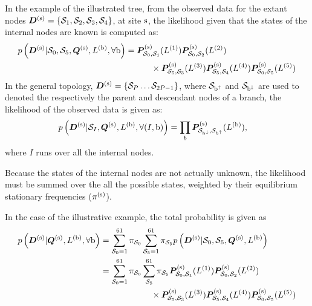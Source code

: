 In the example of the illustrated tree, from the observed data for the extant nodes $\bm{D}^{(\text{s})} = \{ \mathcal{S}_1,\mathcal{S}_2, \mathcal{S}_3, \mathcal{S}_4 \}$, at site $\text{s}$, the likelihood given that the states of the internal nodes are known is computed as:
\begin{align}
	p\left(\bm{D}^{(\text{s})}| \mathcal{S}_0, \mathcal{S}_5, \bm{Q}^{(\text{s})}, L^{(\text{b})}, \forall \text{b} \right) & = \bm{P}^{(\text{s})}_{\mathcal{S}_0, \mathcal{S}_1}(L^{(1)})
	\bm{P}^{(\text{s})}_{\mathcal{S}_0, \mathcal{S}_2}(L^{(2)}) \\
	& \quad \quad \quad
	\times \bm{P}^{(\text{s})}_{\mathcal{S}_5, \mathcal{S}_3}(L^{(3)})
	\bm{P}^{(\text{s})}_{\mathcal{S}_5, \mathcal{S}_4}(L^{(4)})
	\bm{P}^{(\text{s})}_{\mathcal{S}_0, \mathcal{S}_5}(L^{(5)}) \notag
\end{align}
In the general topology, $\bm{D}^{(\text{s})} = \{ \mathcal{S}_P \hdots \mathcal{S}_{2P-1} \}$, where $\mathcal{S}_{\text{b}^{\uparrow}}$ and $\mathcal{S}_{\text{b}^{\downarrow}}$ are used to denoted the respectively the parent and descendant nodes of a branch, the likelihood of the observed data is given as:
\begin{align}
p\left(\bm{D}^{(\text{s})}| \mathcal{S}_{I}, \bm{Q}^{(\text{s})}, L^{(\text{b})}, \forall (I, \text{b}) \right) & = \prod_{b} \bm{P}^{(\text{s})}_{\mathcal{S}_{\text{b}^{\downarrow}}, \mathcal{S}_{\text{b}^{\uparrow}}}(L^{(\text{b})}),
\end{align}
where $I$ runs over all the internal nodes.

Because the  states of the internal nodes are not actually unknown, the likelihood must be summed over the all the possible states, weighted by their equilibrium stationary frequencies ($\pi^{(\text{s})}$).

In the case of the illustrative example, the total probability is given as
\begin{align}
	p\left(\bm{D}^{(\text{s})}| \bm{Q}^{(\text{s})}, L^{(\text{b})} , \forall \text{b} \right) & = \sum_{\mathcal{S}_0=1}^{61} \pi_{\mathcal{S}_0} \sum_{\mathcal{S}_5=1}^{61} \pi_{\mathcal{S}_5} p\left(\bm{D}^{(\text{s})}| \mathcal{S}_0, \mathcal{S}_5, \bm{Q}^{(\text{s})}, L^{(\text{b})} \right) \\
	& = \sum_{\mathcal{S}_0=1}^{61} \pi_{\mathcal{S}_0} \sum_{\mathcal{S}_5}^{61} \pi_{\mathcal{S}_5} \bm{P}^{(\text{s})}_{\mathcal{S}_0, \mathcal{S}_1}(L^{(1)})
	\bm{P}^{(\text{s})}_{\mathcal{S}_0, \mathcal{S}_2}(L^{(2)}) \\
	& \qquad \qquad \qquad
	\times \bm{P}^{(\text{s})}_{\mathcal{S}_5, \mathcal{S}_3}(L^{(3)})
	\bm{P}^{(\text{s})}_{\mathcal{S}_5, \mathcal{S}_4}(L^{(4)})
	\bm{P}^{(\text{s})}_{\mathcal{S}_0, \mathcal{S}_5}(L^{(5)})\notag
\end{align}

